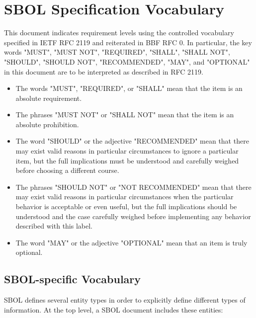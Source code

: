 \section{SBOL Specification Vocabulary}

This document indicates requirement levels using the controlled vocabulary specified in IETF RFC 2119 and reiterated in BBF RFC 0.
In particular, the key words "MUST", "MUST NOT", "REQUIRED", "SHALL", "SHALL NOT", "SHOULD", "SHOULD NOT", "RECOMMENDED", "MAY", and "OPTIONAL" in this document are to be interpreted as described in RFC 2119.

\begin{itemize}
\item The words "MUST", "REQUIRED", or "SHALL" mean that the item is an absolute requirement.
\item The phrases "MUST NOT" or "SHALL NOT" mean that the item is an absolute prohibition.
\item The word "SHOULD" or the adjective "RECOMMENDED" mean that there may exist valid reasons in particular circumstances to ignore a particular item, but the full implications must be understood and carefully weighed before choosing a different course.
\item The phrases "SHOULD NOT" or "NOT RECOMMENDED" mean that there may exist valid reasons in particular circumstances when the particular behavior is acceptable or even useful, but the full implications should be understood and the case carefully weighed before implementing any behavior described with this label.
\item The word "MAY" or the adjective "OPTIONAL" mean that an item is truly optional.
\end{itemize}

\subsection{SBOL-specific Vocabulary}

SBOL defines several entity types in order to explicitly define different types of information. At the top level, a SBOL document includes these entities:

